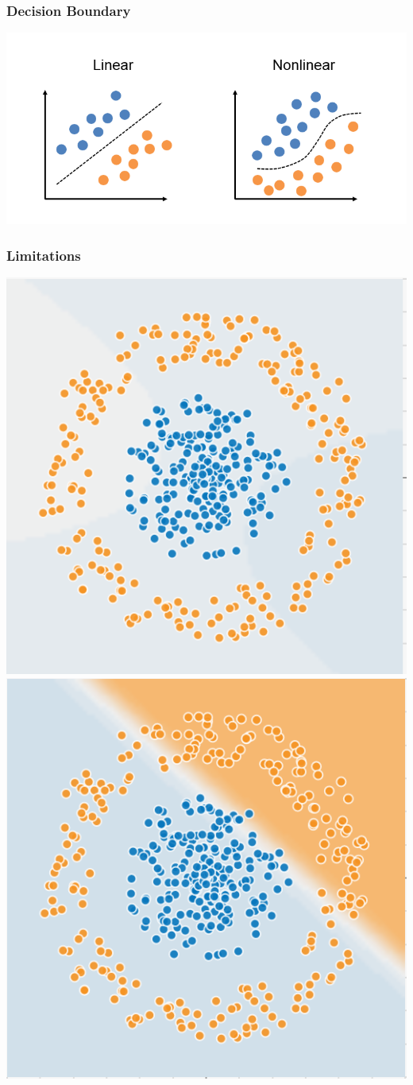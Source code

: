 \begin{frame}
    \frametitle{Decision Boundary}
    \center\includegraphics[width=.9\textwidth]{Images/linear_vs_non_linear.png}
\end{frame}

\begin{frame}
    \frametitle{Limitations}
    \includegraphics[width=.45\textwidth]{Images/circles.png}
    \includegraphics[width=.45\textwidth]{Images/circles_perceptron.png}
\end{frame}

